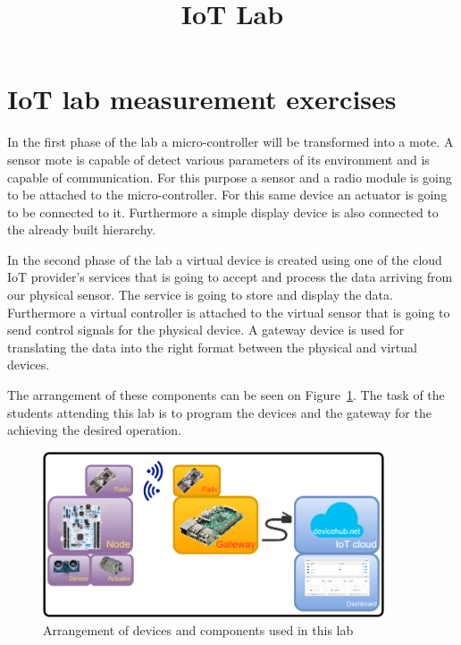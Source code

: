 \documentclass[a4paper]{article}
\title{IoT Lab}
\author{}
\date{}
\begin{document}
\maketitle

\tableofcontents

\section{IoT lab measurement exercises}

In the first phase of the lab a micro-controller will be transformed into a mote. A sensor mote is capable of detect
various parameters of its environment and is capable of communication. For this purpose a sensor and a radio module is
going to be attached to the micro-controller. For this same device an actuator is going to be connected to it.
Furthermore a simple display device is also connected to the already built hierarchy.

In the second phase of the lab a virtual device is created using one of the cloud IoT provider's services that is going
to accept and process the data arriving from our physical sensor. The service is going to store and display the data.
Furthermore a virtual controller is attached to the virtual sensor that is going to send control signals for the
physical device. A gateway device is used for translating the data into the right format between the physical and
virtual devices.

The arrangement of these components can be seen on Figure~\ref{fig:meas-arrangement}. The task of the students
attending this lab is to program the devices and the gateway for the achieving the desired operation.

\begin{figure}[H]
    \centering
    \includegraphics[width=0.9\textwidth]{figures/devices-arrangement.png}
    \caption{Arrangement of devices and components used in this lab}
    \label{fig:meas-arrangement}
\end{figure}
\end{document}
